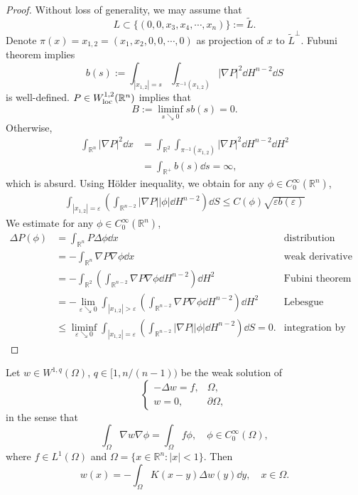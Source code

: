 \begin{proof}
  Without loss of generality, we may assume that 
  \[
  L\subset\{(0,0,x_3,x_4,\cdots,x_n)\} := \tilde L.
  \]
  Denote $\pi(x) = x_{1,2} = (x_1, x_2, 0,0,\cdots,0)$ as projection of $x$ to $\tilde L^\bot $.
  Fubuni theorem implies 
  \[
  b(s) := \int_{|x_{1,2}|=s}\int_{\pi^{-1}(x_{1,2})}|\nabla P|^2\dd H^{n-2}\dd S
  \]
  is well-defined.
  $P\in W^{1,2}_{\operatorname*{loc}}(\mathbb R^n)$ implies that 
  \[
  B := \liminf_{s\searrow0}sb(s) = 0.
  \]
  Otherwise,
  \begin{align*}
    \int_{\mathbb R^n}|\nabla P|^2\dd x 
    &= \int_{\mathbb R^2}\int_{\pi^{-1}(x_{1,2})}|\nabla P|^2\dd H^{n-2}\dd H^2\\
    &= \int_{\mathbb R^+}b(s)\dd s = \infty,
  \end{align*}
  which is absurd.
  Using H\"older inequality, we obtain for any $\phi\in C_0^{\infty}(\mathbb R^n)$,
  \begin{align*}
    \int_{|x_{1,2}|=\varepsilon}
    \left(\int_{\mathbb R^{n-2}}|\nabla P||\phi|\dd H^{n-2}\right)\dd S
    \leq C(\phi)\sqrt{\varepsilon b(\varepsilon)}
  \end{align*}
  We estimate for any $\phi\in C_0^{\infty}(\mathbb R^n)$,
  \begin{align*}
    \Delta P(\phi) 
    &= \int_{\mathbb R^n}P\Delta\phi\dd x &\text{distribution derivative}\\
    &= -\int_{\mathbb R^n}\nabla P\nabla \phi\dd x &\text{weak derivative}\\
    &= -\int_{\mathbb R^{2}}\left(\int_{\mathbb R^{n-2}}\nabla P\nabla \phi\dd H^{n-2} \right)\dd H^2
    &\text{Fubini theorem}\\
    &= -\lim_{\varepsilon\searrow0}
    \int_{|x_{1,2}| > \varepsilon} \left(\int_{\mathbb R^{n-2}}\nabla P\nabla \phi\dd H^{n-2}\right)\dd H^2
    &\text{Lebesgue dominated convergence theorem}\\
    &\leq \liminf_{\varepsilon\searrow0}\int_{|x_{1,2}|=\varepsilon}
    \left(\int_{\mathbb R^{n-2}}|\nabla P||\phi|\dd H^{n-2}\right)\dd S = 0.
    &\text{integration by parts}
  \end{align*}
\end{proof}

\begin{lemma}
  Let $w\in W^{1,q}(\Omega)$, $q\in[1,n/(n-1))$ be the weak solution of 
  \begin{equation*}
    \begin{cases}
      -\Delta w = f, & \Omega,\\
      w = 0, &\partial\Omega,
    \end{cases}
  \end{equation*}
  in the sense that 
  \[
  \int_\Omega \nabla w\nabla \phi = \int_\Omega f\phi, \quad\phi\in C_0^\infty(\Omega),
  \]
  where $f\in L^1(\Omega)$ and $\Omega = \{x\in \mathbb R^n: |x| < 1\}$.
  Then 
  \[
  w(x) = -\int_{\Omega}K(x-y)\Delta w(y)\dd y, \quad x\in\Omega.
  \]
\end{lemma}

